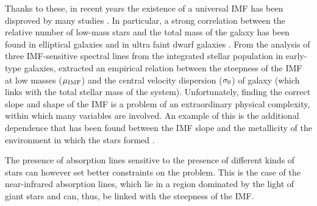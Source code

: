 	Thanks to these, in recent years the existence of a universal IMF has been disproved by many studies \citep{Bastian10, Cappellari12}. 
	In particular, a strong correlation between the relative number of low-mass stars and the total mass of the galaxy 
	has been found in elliptical galaxies \citep{Treu10, vanDokkum11, Dutton12, Conroy12} and in ultra faint dwarf galaxies \citep{Geha13}.
	From the analysis of three IMF-sensitive spectral lines from the integrated stellar population in early-type galaxies, 
	\citet{Ferreras13, LaBarbera13} extracted an empirical relation between the steepness of the IMF at low 
	masses ($\mu_{\rm{IMF}}$) and 
	the central velocity dispersion ($\sigma_{\rm{0}}$) of galaxy (which links with the total stellar mass of the system). 
	Unfortunately, finding the correct slope and shape of the IMF is a problem of an extraordinary physical complexity, within which 
	many variables are involved. 
	An example of this is the additional dependence that has been found between the IMF slope and the metallicity of the 
	environment in which the stars formed \citep{Kroupa02}. 
			
	The presence of absorption lines sensitive to the presence of different kinds of stars can however set 
	better constraints on the problem. 
	This is the case of the near-infrared absorption lines, which lie in a region dominated by the light of giant stars and can, thus, 
	be linked with the steepness of the IMF. 




